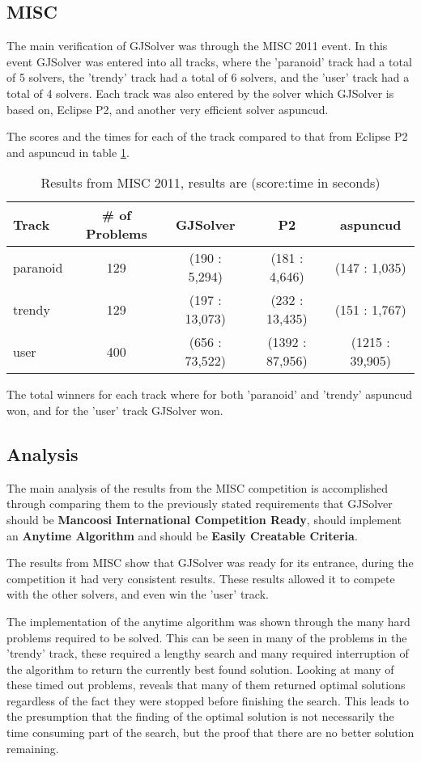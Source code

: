 \subsection{MISC}
The main verification of GJSolver was through the MISC 2011 event.
In this event GJSolver was entered into all tracks, where the 'paranoid' track had a total of 5 solvers, the 'trendy' track had a total of 6 solvers, 
and the 'user' track had a total of 4 solvers.
Each track was also entered by the solver which GJSolver is based on, Eclipse P2, and another very efficient solver aspuncud.

The scores and the times for each of the track compared to that from Eclipse P2 and aspuncud in table \ref{impl.misc2011}.
\begin{table}
\begin{tabular}{| l | c | c | c | c |}\hline
Track & \# of Problems & GJSolver & P2 & aspuncud\\ \hline
paranoid & 129 & (190 : 5,294) & (181 : 4,646) & (147 : 1,035) \\ \hline
trendy & 129 & (197 : 13,073) & (232 : 13,435) & (151 : 1,767) \\ \hline
user & 400 & (656 : 73,522) & (1392 : 87,956) & (1215 : 39,905) \\ \hline
\end{tabular}
\caption{Results from MISC 2011, results are (score:time in seconds)}
\label{impl.misc2011}
\end{table}

The total winners for each track where for both 'paranoid' and 'trendy' aspuncud won, and for the 'user' track GJSolver won.

\subsection{Analysis}
The main analysis of the results from the MISC competition is accomplished through comparing them to the previously stated requirements that
GJSolver should be \textbf{Mancoosi International Competition Ready}, should implement an \textbf{Anytime Algorithm} and should be \textbf{Easily Creatable Criteria}.

The results from MISC show that GJSolver was ready for its entrance, during the competition it had very consistent results.
These results allowed it to compete with the other solvers, and even win the 'user' track.

The implementation of the anytime algorithm was shown through the many hard problems required to be solved.
This can be seen in many of the problems in the 'trendy' track, these required a lengthy search and many required interruption of the algorithm to return the currently best found solution.
Looking at many of these timed out problems, reveals that many of them returned optimal solutions regardless of the fact they were stopped before finishing the search.
This leads to the presumption that the finding of the optimal solution is not necessarily the time consuming part of the search, but the proof that there are no better solution remaining.

